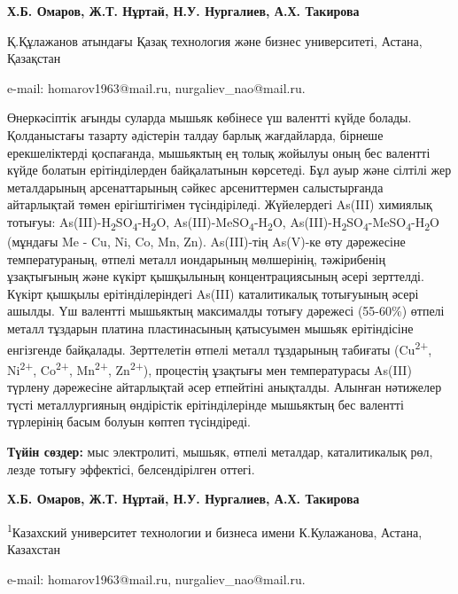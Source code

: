 
\begin{center}
{\bfseries Х.Б. Омаров\envelope, Ж.Т. Нұртай, Н.У.
Нургалиев\envelope, А.Х. Такирова}

Қ.Құлажанов атындағы Қазақ технология және бизнес университеті, Астана,
Қазақстан

e-mail: homarov1963@mail.ru, nurgaliev\_nao@mail.ru.
\end{center}

Өнеркәсіптік ағынды суларда мышьяк көбінесе үш валентті күйде болады.
Қолданыстағы тазарту әдістерін талдау барлық жағдайларда, бірнеше
ерекшеліктерді қоспағанда, мышьяктың ең толық жойылуы оның бес валентті
күйде болатын ерітінділерден байқалатынын көрсетеді. Бұл ауыр және
сілтілі жер металдарының арсенаттарының сәйкес арсениттермен
салыстырғанда айтарлықтай төмен ерігіштігімен түсіндіріледі. Жүйелердегі
As(III) химиялық тотығуы:
As(III)-H\textsubscript{2}SO\textsubscript{4}-H\textsubscript{2}O,
As(III)-MeSO\textsubscript{4}-H\textsubscript{2}O,
As(III)-H\textsubscript{2}SO\textsubscript{4}-MeSO\textsubscript{4}-H\textsubscript{2}O
(мұндағы Me - Cu, Ni, Co, Mn, Zn). As(III)-тің As(V)-ке өту дәрежесіне
температураның, өтпелі металл иондарының мөлшерінің, тәжірибенің
ұзақтығының және күкірт қышқылының концентрациясының әсері зерттелді.
Күкірт қышқылы ерітінділеріндегі As(III) каталитикалық тотығуының әсері
ашылды. Үш валентті мышьяктың максималды тотығу дәрежесі (55-60\%)
өтпелі металл тұздарын платина пластинасының қатысуымен мышьяк
ерітіндісіне енгізгенде байқалады. Зерттелетін өтпелі металл тұздарының
табиғаты (Cu\textsuperscript{2+}, Ni\textsuperscript{2+},
Co\textsuperscript{2+}, Mn\textsuperscript{2+}, Zn\textsuperscript{2+}),
процестің ұзақтығы мен температурасы As(III) түрлену дәрежесіне
айтарлықтай әсер етпейтіні анықталды. Алынған нәтижелер түсті
металлургияның өндірістік ерітінділерінде мышьяктың бес валентті
түрлерінің басым болуын көптеп түсіндіреді.

{\bfseries Түйін сөздер:} мыс электролиті, мышьяк, өтпелі металдар,
каталитикалық рөл, лезде тотығу эффектісі, белсендірілген оттегі.


\begin{center}
{\bfseries Х.Б. Омаров\envelope, Ж.Т. Нұртай, Н.У.
Нургалиев\envelope, А.Х. Такирова}

\textsuperscript{1}Казахский университет технологии и бизнеса имени
К.Кулажанова, Астана, Казахстан

e-mail: homarov1963@mail.ru, nurgaliev\_nao@mail.ru.
\end{center}

